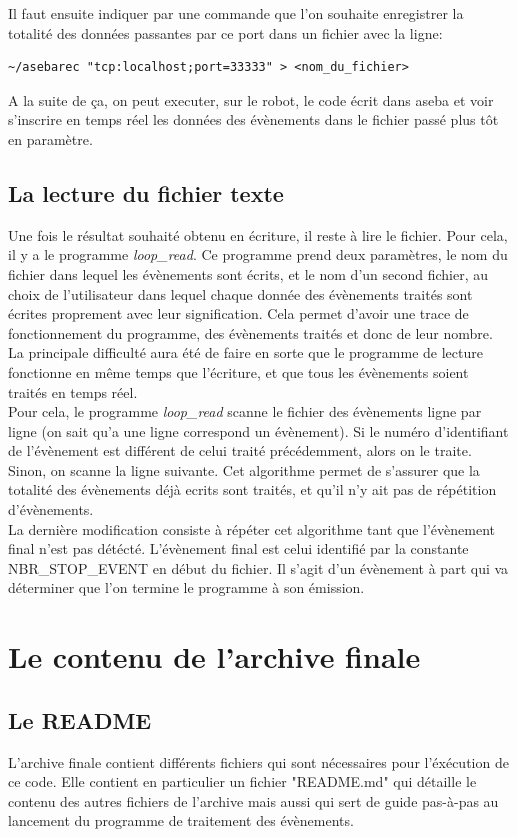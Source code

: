 \documentclass[a4paper, 12pt]{report}
\begin{document}
Il faut ensuite indiquer par une commande que l'on souhaite enregistrer la totalité des données passantes par ce port dans un fichier avec la ligne:
\begin{verbatim}
~/asebarec "tcp:localhost;port=33333" > <nom_du_fichier>
\end{verbatim}
 

A la suite de ça, on peut executer, sur le robot, le code écrit dans aseba et voir s'inscrire en temps réel les données des évènements dans le fichier passé plus tôt en paramètre.

\section{La lecture du fichier texte}
Une fois le résultat souhaité obtenu en écriture, il reste à lire le fichier. Pour cela, il y a le programme \textit{loop\_read}. Ce programme prend deux paramètres, le nom du fichier dans lequel les évènements sont écrits, et le nom d'un second fichier, au choix de l'utilisateur dans lequel chaque donnée des évènements traités sont écrites proprement avec leur signification. Cela permet d'avoir une trace de fonctionnement du programme, des évènements traités et donc de leur nombre.\\
La principale difficulté aura été de faire en sorte que le programme de lecture fonctionne en même temps que l'écriture, et que tous les évènements soient traités en temps réel.\\
Pour cela, le programme \textit{loop\_read} scanne le fichier des évènements ligne par ligne (on sait qu'a une ligne correspond un évènement). Si le numéro d'identifiant de l'évènement est différent de celui traité précédemment, alors on le traite. Sinon, on scanne la ligne suivante. Cet algorithme permet de s'assurer que la totalité des évènements déjà ecrits sont traités, et qu'il n'y ait pas de répétition d'évènements.\\
La dernière modification consiste à répéter cet algorithme tant que l'évènement final n'est pas détécté. L'évènement final est celui identifié par la constante\\
 NBR\_STOP\_EVENT en début du fichier. Il s'agit d'un évènement à part qui va déterminer que l'on termine le programme à son émission.


\chapter{Le contenu de l'archive finale}
\section{Le README}
L'archive finale contient différents fichiers qui sont nécessaires pour l'éxécution de ce code. Elle contient en particulier un fichier "README.md" qui détaille le contenu des autres fichiers de l'archive mais aussi qui sert de guide pas-à-pas au lancement du programme de traitement des évènements.
\end{document}
